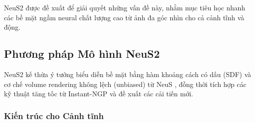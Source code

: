 NeuS2 \cite{Wang2023NeuS2} được đề xuất để giải quyết những vấn đề này, nhằm mục tiêu học nhanh các bề mặt ngầm neural chất lượng cao từ ảnh đa góc nhìn cho cả cảnh tĩnh và động.

\subsection{Phương pháp Mô hình NeuS2}

NeuS2 kế thừa ý tưởng biểu diễn bề mặt bằng hàm khoảng cách có dấu (SDF) và cơ chế volume rendering không lệch (unbiased) từ NeuS \cite{Wang2021NeuS}, đồng thời tích hợp các kỹ thuật tăng tốc từ Instant-NGP \cite{Muller2022InstantNGP} và đề xuất các cải tiến mới.

\subsubsection{Kiến trúc cho Cảnh tĩnh}
